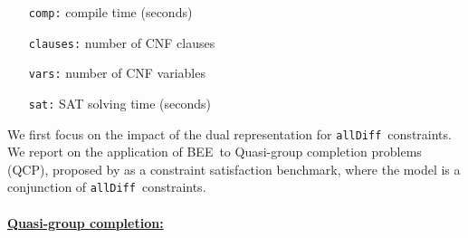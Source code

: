 \documentclass{tlp}
\newcommand{\allDifferent}{\texttt{allDiff}}
\newcommand{\bee}{\textsf{BEE}}
\begin{document}
\vspace{-3mm}
\qquad\begin{minipage}{0.45\linewidth}
\qquad\begin{itemize}
\item[\texttt{comp:}]     compile time (seconds) 
\item[\texttt{clauses:}]  number of CNF clauses
\end{itemize}
\end{minipage}
\begin{minipage}{0.4\linewidth}
\qquad\begin{itemize}
\item[\texttt{vars:}]     number of CNF variables
\item[\texttt{sat:}]      SAT solving time (seconds)
\end{itemize}
\end{minipage}
\medskip


We first focus on the impact of the dual representation for
\allDifferent\ constraints. We report on the application of \bee\ to
Quasi-group completion problems (QCP), proposed by
 as a constraint satisfaction benchmark,
where the model is a conjunction of \allDifferent\ constraints.


\vspace{-3mm}
\paragraph{\underline{Quasi-group completion:}}
\end{document}
